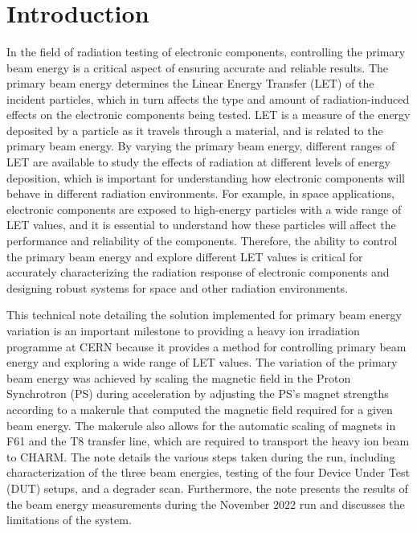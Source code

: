 \documentclass{cernatsnote}
\begin{document}
\\ \\ \\ 

\begingroup
\color{black}
\tableofcontents
\endgroup

\pagebreak

\section{Introduction}
In the field of radiation testing of electronic components, controlling the primary beam energy is a critical aspect of ensuring accurate and reliable results. The primary beam energy determines the Linear Energy Transfer (LET) of the incident particles, which in turn affects the type and amount of radiation-induced effects on the electronic components being tested. LET is a measure of the energy deposited by a particle as it travels through a material, and is related to the primary beam energy. By varying the primary beam energy, different ranges of LET are available to study the effects of radiation at different levels of energy deposition, which is important for understanding how electronic components will behave in different radiation environments. For example, in space applications, electronic components are exposed to high-energy particles with a wide range of LET values, and it is essential to understand how these particles will affect the performance and reliability of the components. Therefore, the ability to control the primary beam energy and explore different LET values is critical for accurately characterizing the radiation response of electronic components and designing robust systems for space and other radiation environments.

This technical note detailing the solution implemented for primary beam energy variation is an important milestone to providing a heavy ion irradiation programme at CERN because it provides a method for controlling primary beam energy and exploring a wide range of LET values. The variation of the primary beam energy was achieved by scaling the magnetic field in the Proton Synchrotron (PS) during acceleration by adjusting the PS's magnet strengths according to a makerule that computed the magnetic field required for a given beam energy. The makerule also allows for the automatic scaling of magnets in F61 and the T8 transfer line, which are required to transport the heavy ion beam to CHARM. The note details the various steps taken during the run, including characterization of the three beam energies, testing of the four Device Under Test (DUT) setups, and a degrader scan. Furthermore, the note presents the results of the beam energy measurements during the November 2022 run and discusses the limitations of the system.
\end{document}
